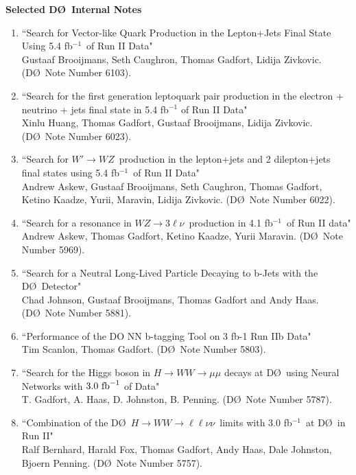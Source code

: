 \documentclass[12pt]{article}
\newcommand{\dzero}{D\O}
\begin{document}
\noindent
{\Large \textbf{Selected D\O~Internal Notes}}
\vspace{-2mm}
\begin{enumerate}

\item{``Search for Vector-like Quark Production in the Lepton+Jets Final State Using 5.4 fb$^{-1}$~of Run II Data" \\
Gustaaf Brooijmans, Seth Caughron, Thomas Gadfort, Lidija Zivkovic. (\dzero~Note Number 6103).} 

\item{``Search for the first generation leptoquark pair production in the electron + neutrino + jets final state in 5.4 fb$^{-1}$ of Run II Data" \\
Xinlu Huang, Thomas Gadfort, Gustaaf Brooijmans, Lidija Zivkovic. (\dzero~Note Number 6023).}

\item{``Search for $W'\rightarrow WZ$~production in the lepton+jets and 2 dilepton+jets final states using 5.4 fb$^{-1}$~of Run II Data" \\
Andrew Askew, Gustaaf Brooijmans, Seth Caughron, Thomas Gadfort, Ketino Kaadze, Yurii, Maravin, Lidija Zivkovic. (\dzero~Note Number 6022).}

\item{``Search for a resonance in $WZ\rightarrow 3\ell\nu$~production in 4.1 fb$^{-1}$~of Run II data"\\
Andrew Askew, Thomas Gadfort, Ketino Kaadze, Yurii Maravin.  (\dzero~Note Number 5969). }

\item{``Search for a Neutral Long-Lived Particle Decaying to b-Jets with the \dzero~Detector" \\
Chad Johnson, Gustaaf Brooijmans, Thomas Gadfort and Andy Haas. (\dzero~Note Number 5881).}

\item{``Performance of the DO NN b-tagging Tool on 3 fb-1 Run IIb Data"\\
Tim Scanlon, Thomas Gadfort. (\dzero~Note Number 5803).}

\item{``Search for the Higgs boson in $H\rightarrow WW\rightarrow \mu\mu$ decays at \dzero~using Neural Networks with $3.0~\rm{fb}^{-1}$ of Data" \\
T. Gadfort, A. Haas, D. Johnston, B. Penning. (\dzero~Note Number 5787).}

\item{``Combination of the \dzero~$H\rightarrow WW\rightarrow \ell\ell\nu\nu$~limits with 3.0 fb$^{-1}$~at \dzero~in Run II"\\ 
Ralf Bernhard, Harald Fox, Thomas Gadfort, Andy Haas, Dale Johnston, Bjoern Penning. (\dzero~Note Number 5757).}


\end{enumerate}
\end{document}
